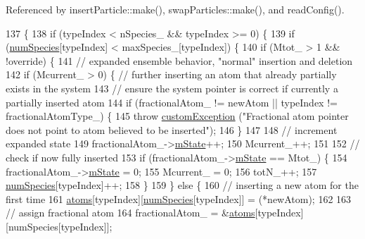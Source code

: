 Referenced by insert\-Particle\-::make(), swap\-Particles\-::make(), and read\-Config().


\begin{DoxyCode}
137                                                                              \{
138     \textcolor{keywordflow}{if} (typeIndex < nSpecies\_ && typeIndex >= 0) \{
139         \textcolor{keywordflow}{if} (\hyperlink{classsim_system_a9eea865e6dc1cff377b1e79c4d9c23f0}{numSpecies}[typeIndex] < maxSpecies\_[typeIndex]) \{
140             \textcolor{keywordflow}{if} (Mtot\_ > 1 && !\textcolor{keyword}{override}) \{
141                 \textcolor{comment}{// expanded ensemble behavior, "normal" insertion and deletion}
142                 \textcolor{keywordflow}{if} (Mcurrent\_ > 0) \{ \textcolor{comment}{// further inserting an atom that already partially exists in the
       system}
143                     \textcolor{comment}{// ensure the system pointer is correct if currently a partially inserted atom}
144                     \textcolor{keywordflow}{if} (fractionalAtom\_ != newAtom || typeIndex != fractionalAtomType\_) \{
145                         \textcolor{keywordflow}{throw} \hyperlink{classcustom_exception}{customException} (\textcolor{stringliteral}{"Fractional atom pointer does not point to
       atom believed to be inserted"});
146                     \}
147 
148                     \textcolor{comment}{// increment expanded state}
149                     fractionalAtom\_->\hyperlink{classatom_a3cb00c0c5b7533657e05af6ff4a42740}{mState}++;
150                     Mcurrent\_++;
151 
152                     \textcolor{comment}{// check if now fully inserted}
153                     \textcolor{keywordflow}{if} (fractionalAtom\_->\hyperlink{classatom_a3cb00c0c5b7533657e05af6ff4a42740}{mState} == Mtot\_) \{
154                         fractionalAtom\_->\hyperlink{classatom_a3cb00c0c5b7533657e05af6ff4a42740}{mState} = 0;
155                         Mcurrent\_ = 0;
156                         totN\_++;
157                         \hyperlink{classsim_system_a9eea865e6dc1cff377b1e79c4d9c23f0}{numSpecies}[typeIndex]++;
158                     \}
159                 \} \textcolor{keywordflow}{else} \{
160                     \textcolor{comment}{// inserting a new atom for the first time}
161                     \hyperlink{classsim_system_a90421b19082f7fb8fc23b7264b1161e4}{atoms}[typeIndex][\hyperlink{classsim_system_a9eea865e6dc1cff377b1e79c4d9c23f0}{numSpecies}[typeIndex]] = (*newAtom);
162 
163                     \textcolor{comment}{// assign fractional atom}
164                     fractionalAtom\_ = &\hyperlink{classsim_system_a90421b19082f7fb8fc23b7264b1161e4}{atoms}[typeIndex][numSpecies[typeIndex]];

\end{DoxyCode}
